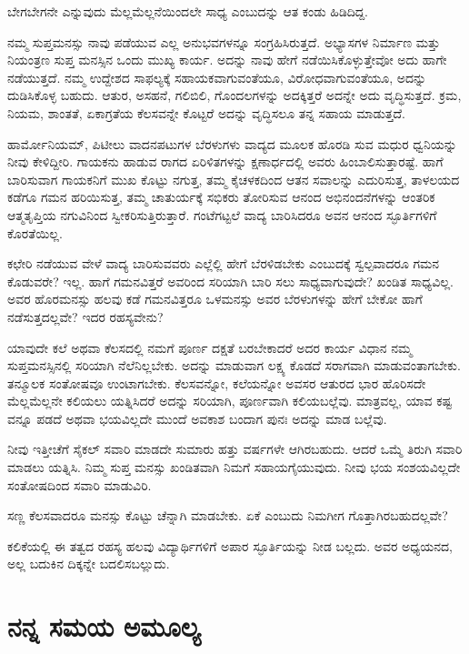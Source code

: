 ಬೇಗಬೇಗನೇ ಎನ್ನುವುದು ಮೆಲ್ಲಮೆಲ್ಲನೆಯಿಂದಲೇ ಸಾಧ್ಯ ಎಂಬುದನ್ನು ಆತ ಕಂಡು ಹಿಡಿದಿದ್ದ.

\vskip 2pt

ನಮ್ಮ ಸುಪ್ತಮನಸ್ಸು ನಾವು ಪಡೆಯುವ ಎಲ್ಲ ಅನುಭವಗಳನ್ನೂ ಸಂಗ್ರಹಿಸಿರುತ್ತದೆ. ಅಭ್ಯಾಸಗಳ ನಿರ್ಮಾಣ ಮತ್ತು ನಿಯಂತ್ರಣ ಸುಪ್ತ ಮನಸ್ಸಿನ ಒಂದು ಮುಖ್ಯ ಕಾರ್ಯ. ಅದನ್ನು ನಾವು ಹೇಗೆ ನಡೆಯಿಸಿಕೊಳ್ಳುತ್ತೇವೋ ಅದು ಹಾಗೇ ನಡೆಯುತ್ತದೆ. ನಮ್ಮ ಉದ್ದೇಶದ ಸಾಫಲ್ಯಕ್ಕೆ ಸಹಾಯಕವಾಗುವಂತೆಯೂ, ವಿರೋಧವಾಗುವಂತೆಯೂ, ಅದನ್ನು ದುಡಿಸಿಕೊಳ್ಳ ಬಹುದು. ಆತುರ, ಅಸಹನೆ, ಗಲಿಬಿಲಿ, ಗೊಂದಲಗಳನ್ನು ಅದಕ್ಕಿತ್ತರೆ ಅದನ್ನೇ ಅದು ವೃದ್ಧಿಸುತ್ತದೆ. ಕ್ರಮ, ನಿಯಮ, ಶಾಂತತೆ, ಏಕಾಗ್ರತೆಯ ಕೆಲಸವನ್ನೇ ಕೊಟ್ಟರೆ ಅದನ್ನು ವೃದ್ಧಿಸಲೂ ತನ್ನ ಸಹಾಯ ಮಾಡುತ್ತದೆ.

\vskip 2pt

ಹಾರ್ಮೋನಿಯಮ್, ಪಿಟೀಲು ವಾದನಪಟುಗಳ ಬೆರಳುಗಳು ವಾದ್ಯದ ಮೂಲಕ ಹೊರಡಿ ಸುವ ಮಧುರ ಧ್ವನಿಯನ್ನು ನೀವು ಕೇಳಿದ್ದೀರಿ. ಗಾಯಕನು ಹಾಡುವ ರಾಗದ ಏರಿಳಿತಗಳನ್ನು ಕ್ಷಣಾರ್ಧದಲ್ಲಿ ಅವರು ಹಿಂಬಾಲಿಸುತ್ತಾರಷ್ಟೆ. ಹಾಗೆ ಬಾರಿಸುವಾಗ ಗಾಯಕನಿಗೆ ಮುಖ ಕೊಟ್ಟು ನಗುತ್ತ, ತಮ್ಮ ಕೈಚಳಕದಿಂದ ಆತನ ಸವಾಲನ್ನು ಎದುರಿಸುತ್ತ, ತಾಳಲಯದ ಕಡೆಗೂ ಗಮನ ಹರಿಯಿಸುತ್ತ, ತಮ್ಮ ಚಾತುರ್ಯಕ್ಕೆ ಸಭಿಕರು ತೋರಿಸುವ ಆನಂದ ಅಭಿನಂದನೆಗಳನ್ನು ಆಂತರಿಕ ಆತ್ಮತೃಪ್ತಿಯ ನಗುವಿನಿಂದ ಸ್ವೀಕರಿಸುತ್ತಿರುತ್ತಾರೆ. ಗಂಟೆಗಟ್ಟಲೆ ವಾದ್ಯ ಬಾರಿಸಿದರೂ ಅವನ ಆನಂದ ಸ್ಫೂರ್ತಿಗಳಿಗೆ ಕೊರತೆಯಿಲ್ಲ.

\vskip 2pt

ಕಛೇರಿ ನಡೆಯುವ ವೇಳೆ ವಾದ್ಯ ಬಾರಿಸುವವರು ಎಲ್ಲೆಲ್ಲಿ ಹೇಗೆ ಬೆರಳಿಡಬೇಕು ಎಂಬುದಕ್ಕೆ ಸ್ವಲ್ಪವಾದರೂ ಗಮನ ಕೊಡುವರೇ? ಇಲ್ಲ. ಹಾಗೆ ಗಮನವಿತ್ತರೆ ಅವರಿಂದ ಸರಿಯಾಗಿ ಬಾರಿ ಸಲು ಸಾಧ್ಯವಾಗುವುದೇ? ಖಂಡಿತ ಸಾಧ್ಯವಿಲ್ಲ. ಅವರ ಹೊರಮನಸ್ಸು ಹಲವು ಕಡೆ ಗಮನವಿತ್ತರೂ ಒಳಮನಸ್ಸು ಅವರ ಬೆರಳುಗಳನ್ನು ಹೇಗೆ ಬೇಕೋ ಹಾಗೆ ನಡೆಸುತ್ತದಲ್ಲವೇ? ಇದರ ರಹಸ್ಯವೇನು?

ಯಾವುದೇ ಕಲೆ ಅಥವಾ ಕೆಲಸದಲ್ಲಿ ನಮಗೆ ಪೂರ್ಣ ದಕ್ಷತೆ ಬರಬೇಕಾದರೆ ಅದರ ಕಾರ್ಯ ವಿಧಾನ ನಮ್ಮ ಸುಪ್ತಮನಸ್ಸಿನಲ್ಲಿ ಸರಿಯಾಗಿ ನೆಲೆನಿಲ್ಲಬೇಕು. ಅದನ್ನು ಮಾಡುವಾಗ ಲಕ್ಷ್ಯ ಕೊಡದೆ ಸರಾಗವಾಗಿ ಮಾಡುವಂತಾಗಬೇಕು. ತನ್ಮೂಲಕ ಸಂತೋಷವೂ ಉಂಟಾಗಬೇಕು. ಕೆಲಸವನ್ನೋ, ಕಲೆಯನ್ನೋ ಅವಸರ ಆತುರದ ಭಾರ ಹೊರಿಸದೇ ಮೆಲ್ಲಮೆಲ್ಲನೇ ಕಲಿಯಲು ಯತ್ನಿಸಿದರೆ ಅದನ್ನು ಸರಿಯಾಗಿ, ಪೂರ್ಣವಾಗಿ ಕಲಿಯಬಲ್ಲೆವು. ಮಾತ್ರವಲ್ಲ, ಯಾವ ಕಷ್ಟ ವನ್ನೂ ಪಡದೆ ಅಥವಾ ಭಯವಿಲ್ಲದೇ ಮುಂದೆ ಅವಕಾಶ ಬಂದಾಗ ಪುನಃ ಅದನ್ನು ಮಾಡ ಬಲ್ಲೆವು.

ನೀವು ಇತ್ತೀಚೆಗೆ ಸೈಕಲ್ ಸವಾರಿ ಮಾಡದೇ ಸುಮಾರು ಹತ್ತು ವರ್ಷಗಳೇ ಆಗಿರಬಹುದು. ಆದರೆ ಒಮ್ಮೆ ತಿರುಗಿ ಸವಾರಿ ಮಾಡಲು ಯತ್ನಿಸಿ. ನಿಮ್ಮ ಸುಪ್ತ ಮನಸ್ಸು ಖಂಡಿತವಾಗಿ ನಿಮಗೆ ಸಹಾಯಗೈಯುವುದು. ನೀವು ಭಯ ಸಂಶಯವಿಲ್ಲದೇ ಸಂತೋಷದಿಂದ ಸವಾರಿ ಮಾಡುವಿರಿ.

ಸಣ್ಣ ಕೆಲಸವಾದರೂ ಮನಸ್ಸು ಕೊಟ್ಟು ಚೆನ್ನಾಗಿ ಮಾಡಬೇಕು. ಏಕೆ ಎಂಬುದು ನಿಮಗೀಗ ಗೊತ್ತಾಗಿರಬಹುದಲ್ಲವೇ?

ಕಲಿಕೆಯಲ್ಲಿ ಈ ತತ್ವದ ರಹಸ್ಯ ಹಲವು ವಿದ್ಯಾರ್ಥಿಗಳಿಗೆ ಅಪಾರ ಸ್ಫೂರ್ತಿಯನ್ನು ನೀಡ ಬಲ್ಲದು. ಅವರ ಅಧ್ಯಯನದ, ಅಲ್ಲ ಬದುಕಿನ ದಿಕ್ಕನ್ನೇ ಬದಲಿಸಬಲ್ಲುದು.


\section*{ನನ್ನ ಸಮಯ ಅಮೂಲ್ಯ}

